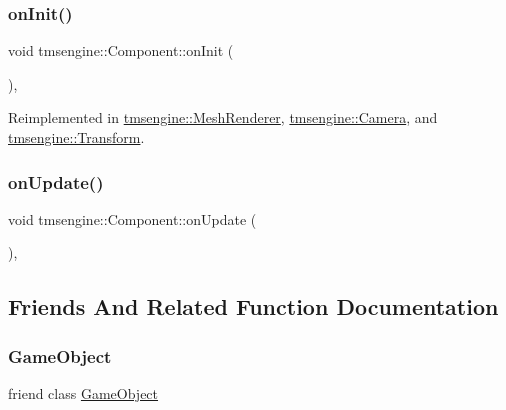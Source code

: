\subsubsection{\texorpdfstring{on\+Init()}{onInit()}}
{\footnotesize\ttfamily void tmsengine\+::\+Component\+::on\+Init (\begin{DoxyParamCaption}{ }\end{DoxyParamCaption})\hspace{0.3cm}{\ttfamily [private]}, {\ttfamily [virtual]}}



Reimplemented in \hyperlink{classtmsengine_1_1_mesh_renderer_a63ea3f394ba6678a6044068dd4253c97}{tmsengine\+::\+Mesh\+Renderer}, \hyperlink{classtmsengine_1_1_camera_a344a385fcb4cdf0d4d8c78fb5f2cba16}{tmsengine\+::\+Camera}, and \hyperlink{classtmsengine_1_1_transform_a761046214917103b7286e36cde981c00}{tmsengine\+::\+Transform}.

\mbox{\label{classtmsengine_1_1_component_a71284093fcc0b89f56fe78bd4da1c2e0}} 
\subsubsection{\texorpdfstring{on\+Update()}{onUpdate()}}
{\footnotesize\ttfamily void tmsengine\+::\+Component\+::on\+Update (\begin{DoxyParamCaption}{ }\end{DoxyParamCaption})\hspace{0.3cm}{\ttfamily [private]}, {\ttfamily [virtual]}}



\subsection{Friends And Related Function Documentation}
\mbox{\label{classtmsengine_1_1_component_a00df87c957d8f7ee0fc51f07a0542f4a}} 
\subsubsection{\texorpdfstring{Game\+Object}{GameObject}}
{\footnotesize\ttfamily friend class \hyperlink{classtmsengine_1_1_game_object}{Game\+Object}\hspace{0.3cm}{\ttfamily [friend]}}



